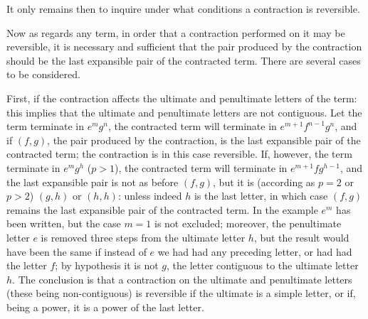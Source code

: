 \documentclass[11pt,a4paper]{article}
\theoremstyle{definition}
\begin{document}
It only remains then to inquire under what conditions a contraction is reversible.

Now as regards any term, in order that a contraction performed on it may be reversible, it is necessary and sufficient that the pair produced by the contraction should be the last expansible pair of the contracted term. There are several cases to be considered.

First, if the contraction affects the ultimate and penultimate letters of the term: this implies that the ultimate and penultimate letters are not contiguous. Let the term terminate in $e^mg^n$, the contracted term will terminate in $e^{m+1}f^{n-1}g^n$, and if $(f,g)$, the pair produced by the contraction, is the last expansible pair of the contracted term; the contraction is in this case reversible. If, however, the term terminate in $e^mg^h$ ($p>1$), the contracted term will terminate in $e^{m+1}fg^{h-1}$, and the last expansible pair is not as before $(f,g)$, but it is (according as $p=2$ or $p>2$) $(g,h)$ or $(h,h)$: unless indeed $h$ is the last letter, in which case $(f,g)$ remains the last expansible pair of the contracted term. In the example $e^m$ has been written, but the case $m=1$ is not excluded; moreover, the penultimate letter $e$ is removed three steps from the ultimate letter $h$, but the result would have been the same if instead of $e$ we had had any preceding letter, or had had the letter $f$; by hypothesis it is not $g$, the letter contiguous to the ultimate letter $h$. The conclusion is that a contraction on the ultimate and penultimate letters (these being non-contiguous) is reversible if the ultimate is a simple letter, or if, being a power, it is a power of the last letter.
\end{document}
